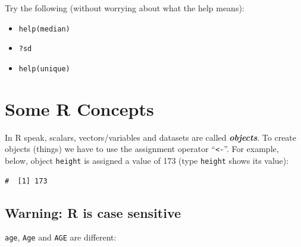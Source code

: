 \documentclass[a4paper,9pt,twocolumn,twoside,printwatermark=false]{pinp}
\providecommand{\tightlist}{%
  \setlength{\itemsep}{0pt}\setlength{\parskip}{0pt}}
\begin{document}
Try the following (without worrying about what the help means):

\begin{itemize}
\tightlist
\item
  \texttt{help(median)}
\item
  \texttt{?sd}
\item
  \texttt{help(unique)}
\end{itemize}

\section{Some R Concepts}\label{some-r-concepts}

In R speak, scalars, vectors/variables and datasets are called
\textbf{\emph{objects}}. To create objects (things) we have to use the
assignment operator ``\texttt{\textless{}-}''. For example, below,
object \texttt{height} is assigned a value of 173 (type \texttt{height}
shows its value):

\begin{Shaded}
\begin{Highlighting}[]
\StringTok{ }
\end{Highlighting}
\end{Shaded}

\begin{ShadedResult}
\begin{verbatim}
#  [1] 173
\end{verbatim}
\end{ShadedResult}

\subsection{Warning: R is case
sensitive}\label{warning-r-is-case-sensitive}

\texttt{age}, \texttt{Age} and \texttt{AGE} are different:

\begin{Shaded}
\begin{Highlighting}[]
\StringTok{ }
\StringTok{ }
\StringTok{ }
\end{Highlighting}
\end{Shaded}

\begin{Shaded}
\begin{Highlighting}[]
\end{Highlighting}
\end{Shaded}
\end{document}
